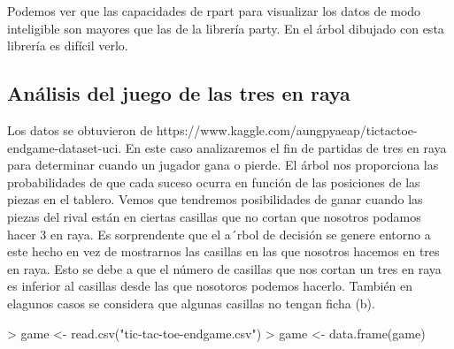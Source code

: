 \documentclass [a4paper] {article}
\begin{document}
Podemos ver que las capacidades de rpart para visualizar los datos de modo inteligible son mayores que las de la librería party.
En el árbol dibujado con esta librería es difícil verlo.

\subsection{Análisis del juego de las tres en raya}
Los datos se obtuvieron de https://www.kaggle.com/aungpyaeap/tictactoe-endgame-dataset-uci.
En este caso analizaremos el fin de partidas de tres en raya para determinar cuando un jugador gana o pierde.
El árbol nos proporciona las probabilidades de que cada suceso ocurra en función de las posiciones de las piezas en el tablero.
Vemos que tendremos posibilidades de ganar cuando las piezas del rival están en ciertas casillas que no cortan que nosotros podamos hacer 3 en raya.
Es sorprendente que el a´rbol de decisión se genere entorno a este hecho en vez de mostrarnos las casillas en las que nosotros hacemos en tres en raya.
Esto se debe a que el número de casillas que nos cortan un tres en raya es inferior al casillas desde las que nosotoros podemos hacerlo.
También en elagunos casos se considera que algunas casillas no tengan ficha (b).
\begin{Schunk}
\begin{Sinput}
> game <- read.csv("tic-tac-toe-endgame.csv")
> game <- data.frame(game)
\end{Sinput}
\end{Schunk}
\end{document}
